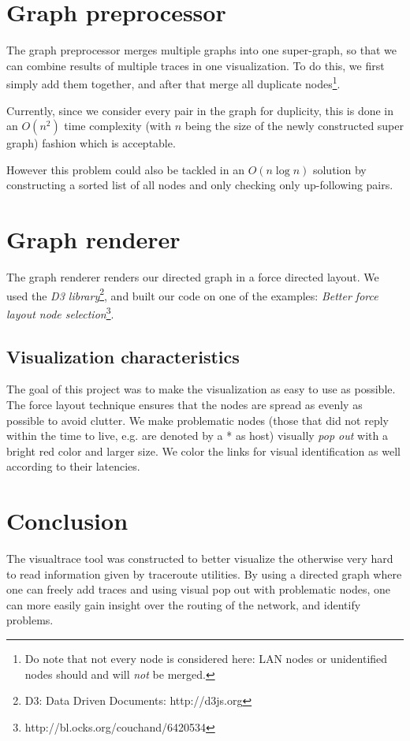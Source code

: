 \documentclass[a4paper,10pt]{article}
\begin{document}
\section{Graph preprocessor}
The graph preprocessor merges multiple graphs into one super-graph, so that we can combine results of multiple traces in one visualization. To do this, we first simply add them together, and after that merge all duplicate nodes\footnote{Do note that not every node is considered here: LAN nodes or unidentified nodes should and will \emph{not} be merged.}.

Currently, since we consider every pair in the graph for duplicity, this is done in an $O(n^2)$ time complexity (with $n$ being the size of the newly constructed super graph) fashion which is acceptable.

However this problem could also be tackled in an $O(n \log n)$ solution by constructing a sorted list of all nodes and only checking only up-following pairs.

\section{Graph renderer}
The graph renderer renders our directed graph in a force directed layout. We used the \emph{D3 library}\footnote{D3: Data Driven Documents: http://d3js.org}, and built our code on one of the examples: \emph{Better force layout node selection}\footnote{http://bl.ocks.org/couchand/6420534}. 

\subsection{Visualization characteristics}
The goal of this project was to make the visualization as easy to use as possible. The force layout technique ensures that the nodes are spread as evenly as possible to avoid clutter. We make problematic nodes (those that did not reply within the time to live, e.g. are denoted by a * as host) visually \emph{pop out} with a bright red color and larger size. We color the links for visual identification as well according to their latencies.

\section{Conclusion}
The visualtrace tool was constructed to better visualize the otherwise very hard to read information given by traceroute utilities. By using a directed graph where one can freely add traces and using visual pop out with problematic nodes, one can more easily gain insight over the routing of the network, and identify problems.
\end{document}

